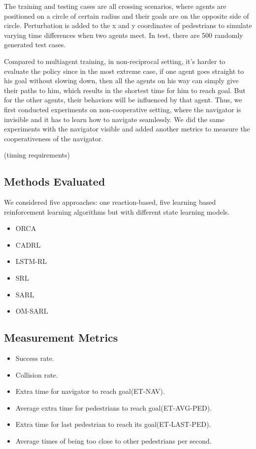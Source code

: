 \documentclass[letterpaper, 10 pt, conference]{ieeeconf}  %
\begin{document}
The training and testing cases are all crossing scenarios, where agents are positioned on a circle of certain radius and their goals are on the opposite side of circle. Perturbation is added to the x and y coordinates of pedestrians to simulate varying time differences when two agents meet. In test, there are 500 randomly generated test cases.

Compared to multiagent training, in non-reciprocal setting, it's harder to evaluate the policy since in the most extreme case, if one agent goes straight to his goal without slowing down, then all the agents on his way can simply give their paths to him, which results in the shortest time for him to reach goal. But for the other agents, their behaviors will be influenced by that agent. Thus, we first conducted experiments on non-cooperative setting, where the navigator is invisible and it has to learn how to navigate seamlessly. We did the same experiments with the navigator visible and added another metrics to measure the cooperativeness of the navigator. 

(timing requirements)

\subsection{Methods Evaluated}
We considered five approaches: one reaction-based, five learning based reinforcement learning algorithms but with different state learning models.

\begin{itemize}

\item ORCA
\item CADRL
\item LSTM-RL
\item SRL
\item SARL
\item OM-SARL

\end{itemize}

\subsection{Measurement Metrics}

\begin{itemize}

\item Success rate.
\item Collision rate.
\item Extra time for navigator to reach goal(ET-NAV).
\item Average extra time for pedestrians to reach goal(ET-AVG-PED).
\item Extra time for last pedestrian to reach its goal(ET-LAST-PED).
\item Average times of being too close to other pedestrians per second.

\end{itemize}
\end{document}
